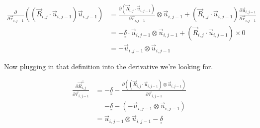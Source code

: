 \documentclass{article}
\renewcommand{\ij}{_{i,j}}
\newcommand{\ijj}{_{i,j-1}}
\newcommand{\ijjj}{_{i,j-2}}
\newcommand{\magn}[1]{\left\vert #1 \right\vert }
\renewcommand{\part}[2]{\frac{\partial #1 }{\partial #2}}
\newcommand{\partbig}[2]{\frac{\partial }{\partial #2}\left( #1 \right)}
\newcommand{\ten}[1]{\underline{\underline{#1}}}
\newcommand{\rij}{\vec{r} \ij}
\newcommand{\Rij}{\vec{R} \ij}
\newcommand{\rijj}{\vec{r} \ijj}
\newcommand{\rijjj}{\vec{r} \ijjj}
\newcommand{\uijj}{\vec{u} \ijj}
\begin{document}
\begin{align*}
  \partbig{\left(\vec{R}\ij \cdot \vec{u} \ijj \right) 
  \vec{u} \ijj 
  }{\vec{r}\ijj}
  &= 
  \part{\left(\vec{R}\ij \cdot \vec{u} \ijj \right)}{\vec{r}\ijj} \otimes
  \uijj 
  +
  \left(\vec{R}\ij \cdot \vec{u} \ijj \right)
  \part{\uijj }{\vec{r}\ijj} 
  \\
  &= 
  - \ten{\delta} \cdot \uijj 
  \otimes \uijj 
  + \left(\Rij \cdot \uijj \right) \times 0
  \\
  &= 
  - \uijj \otimes \uijj
\end{align*}

Now plugging in that definition into the derivative we're looking for.

\begin{align*}
  \part{\vec{R}\ij ^ \bot}{\vec{r}\ijj}  &= - \ten{\delta} 
  - \part{\left(\left(\vec{R}\ij \cdot \uijj \right) \otimes 
  \vec{u} \ijj \right)
  }{\vec{r}\ijj} 
  \\
  &= 
  -
  \ten{\delta}
  -
  \left( - \uijj \otimes \uijj \right)
  \\
  &= 
  \uijj \otimes \uijj 
  -
  \ten{\delta} 
\end{align*}
\end{document}
